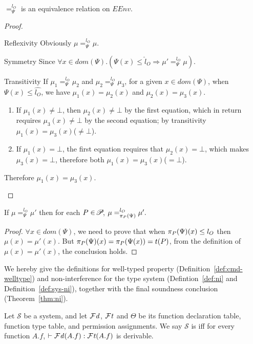 {{{\begin{lemma}\label{lem:ni-eq}
$=_{\Psi}^{l_{O}}$ is an equivalence relation on $EEnv$.
\end{lemma}
 \begin{proof}
\begin{ProofEnumDesc}[style=standard]
	\item [Reflexivity] Obviously $\mu=_{\Psi}^{l_O}\mu$.
	\item [Symmetry] Since $\forall x\in dom(\Psi). (\Psi(x)\leq\hat{l}_O\Rightarrow\mu'=_{\Psi}^{l_O}\mu)$.
	\item [Transitivity] If $\mu_1=_{\Psi}^{l_O}\mu_2$ and $\mu_2=_{\Psi}^{l_O}\mu_3$, for a given $x\in dom(\Psi)$, when $\Psi(x)\leq\hat{l_O}$, we have $\mu_1(x)=\mu_2(x)$ and $\mu_2(x)=\mu_3(x)$.
	\begin{enumerate}[label={(\arabic*)}]
	\item If $\mu_1(x)\neq\bot$, then $\mu_2(x)\neq\bot$ by the first equation, which in return requires $\mu_3(x)\neq\bot$ by the second equation; by transitivity $\mu_1(x)=\mu_3(x)$($\neq\bot$).
	\item If $\mu_1(x)=\bot$, the first equation requires that $\mu_2(x)=\bot$, which makes $\mu_3(x)=\bot$, therefore both $\mu_1(x)=\mu_3(x)$($=\bot$).
	\end{enumerate}
	Therefore $\mu_1(x)=\mu_3(x)$.
\end{ProofEnumDesc}
 \end{proof}
 \begin{lemma}\label{lem:proj}
If $\mu =_{\Psi}^{l_{O}} \mu'$
then for each $P\in\PPS$,
$\mu =_{\app{\Psi}{P}}^{l_O} \mu'.$
\end{lemma}
 \begin{proof}
$\forall x\in dom(\Psi)$, we need to prove that when $\app{\Psi}{P}(x)\leq l_O$ then $\mu(x)=\mu'(x)$. But $\app{\Psi}{P}(x)=\app{\Psi(x)}{P}=t(P)$, from the definition of $\mu(x)=\mu'(x)$, the conclusion holds.
 \end{proof}



We hereby give the definitions for well-typed property
(Definition~\ref{def:cmd-welltype}) and non-interference for the type
system (Defintion~\ref{def:ni} and Definition~\ref{def:sys-ni}),
together with the final soundness conclusion
(Theorem~\ref{thm:ni}).


\begin{definition}\label{def:cmd-welltype}
Let $\mathcal{S}$ be a system, and let $\FD$, $\FT$ and $\Theta$ be
its function declaration table, function type table, and permission
assignments. We say $\mathcal{S}$ is  iff for
every function $A.f$, $\vdash \FD(A.f) : \FT(A.f)$ is derivable.
\end{definition}


}}}
